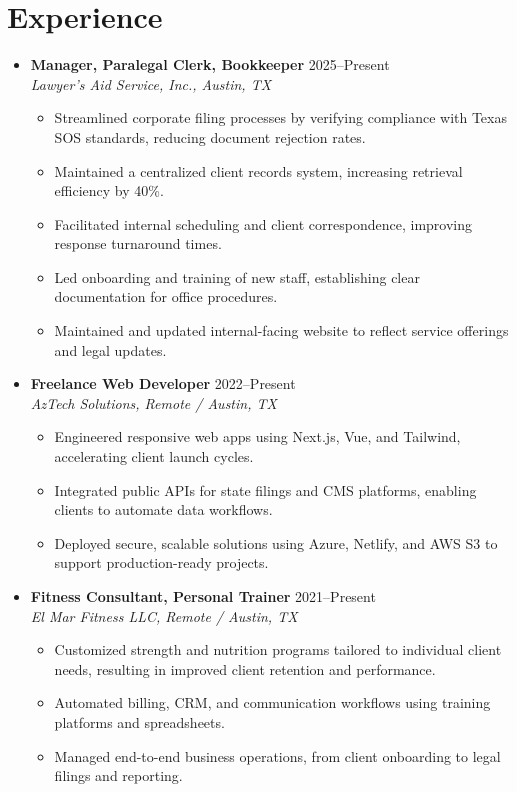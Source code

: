 \documentclass[letterpaper,10pt]{article}
\newcommand{\resumeItem}[1]{\item\small{#1}}
\begin{document}
\section*{Experience}
\begin{itemize}[leftmargin=0.15in]
  \item
    \textbf{Manager, Paralegal Clerk, Bookkeeper} \hfill 2025–Present \\
    \textit{Lawyer's Aid Service, Inc., Austin, TX}
    \begin{itemize}
      \resumeItem{Streamlined corporate filing processes by verifying compliance with Texas SOS standards, reducing document rejection rates.}
      \resumeItem{Maintained a centralized client records system, increasing retrieval efficiency by 40\%.}
      \resumeItem{Facilitated internal scheduling and client correspondence, improving response turnaround times.}
      \resumeItem{Led onboarding and training of new staff, establishing clear documentation for office procedures.}
      \resumeItem{Maintained and updated internal-facing website to reflect service offerings and legal updates.}
    \end{itemize}

  \item
    \textbf{Freelance Web Developer} \hfill 2022–Present \\
    \textit{AzTech Solutions, Remote / Austin, TX}
    \begin{itemize}
      \resumeItem{Engineered responsive web apps using Next.js, Vue, and Tailwind, accelerating client launch cycles.}
      \resumeItem{Integrated public APIs for state filings and CMS platforms, enabling clients to automate data workflows.}
      \resumeItem{Deployed secure, scalable solutions using Azure, Netlify, and AWS S3 to support production-ready projects.}
    \end{itemize}

  \item
    \textbf{Fitness Consultant, Personal Trainer} \hfill 2021–Present \\
    \textit{El Mar Fitness LLC, Remote / Austin, TX}
    \begin{itemize}
      \resumeItem{Customized strength and nutrition programs tailored to individual client needs, resulting in improved client retention and performance.}
      \resumeItem{Automated billing, CRM, and communication workflows using training platforms and spreadsheets.}
      \resumeItem{Managed end-to-end business operations, from client onboarding to legal filings and reporting.}
    \end{itemize}
\end{itemize}
\end{document}

